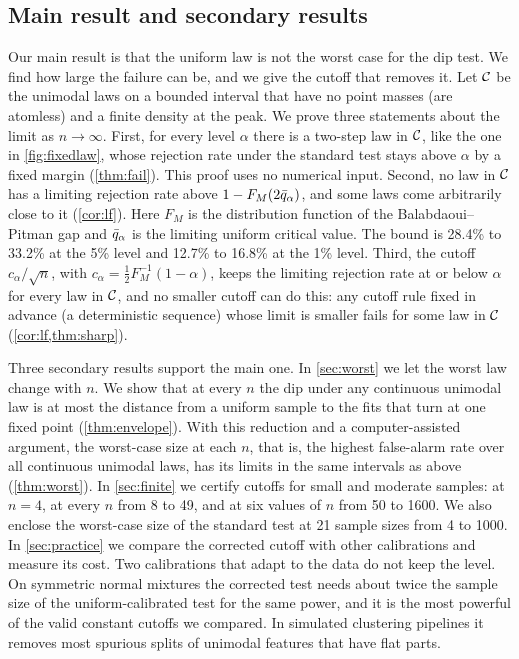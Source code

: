 \subsection{Main result and secondary results}\label{sec:contrib}
Our main result is that the uniform law is not the worst case for the dip test. We find how large the failure can be, and we give the cutoff that removes it. Let $\mathcal{C}$ be the unimodal laws on a bounded interval that have no point masses (are atomless) and a finite density at the peak. We prove three statements about the limit as $n\to\infty$. First, for every level $\alpha$ there is a two-step law in $\mathcal{C}$, like the one in \cref{fig:fixedlaw}, whose rejection rate under the standard test stays above $\alpha$ by a fixed margin (\cref{thm:fail}). This proof uses no numerical input. Second, no law in $\mathcal{C}$ has a limiting rejection rate above $1-F_M(2\bar q_\alpha)$, and some laws come arbitrarily close to it (\cref{cor:lf}). Here $F_M$ is the distribution function of the Balabdaoui--Pitman gap and $\bar q_\alpha$ is the limiting uniform critical value. The bound is 28.4\% to 33.2\% at the 5\% level and 12.7\% to 16.8\% at the 1\% level. Third, the cutoff $c_\alpha/\sqrt n$, with $c_\alpha=\tfrac12F_M^{-1}(1-\alpha)$, keeps the limiting rejection rate at or below $\alpha$ for every law in $\mathcal{C}$, and no smaller cutoff can do this: any cutoff rule fixed in advance (a deterministic sequence) whose limit is smaller fails for some law in $\mathcal{C}$ (\cref{cor:lf,thm:sharp}).

Three secondary results support the main one. In \cref{sec:worst} we let the worst law change with $n$. We show that at every $n$ the dip under any continuous unimodal law is at most the distance from a uniform sample to the fits that turn at one fixed point (\cref{thm:envelope}). With this reduction and a computer-assisted argument, the worst-case size at each $n$, that is, the highest false-alarm rate over all continuous unimodal laws, has its limits in the same intervals as above (\cref{thm:worst}). In \cref{sec:finite} we certify cutoffs for small and moderate samples: at $n=4$, at every $n$ from 8 to 49, and at six values of $n$ from 50 to 1600. We also enclose the worst-case size of the standard test at 21 sample sizes from 4 to 1000. In \cref{sec:practice} we compare the corrected cutoff with other calibrations and measure its cost. Two calibrations that adapt to the data do not keep the level. On symmetric normal mixtures the corrected test needs about twice the sample size of the uniform-calibrated test for the same power, and it is the most powerful of the valid constant cutoffs we compared. In simulated clustering pipelines it removes most spurious splits of unimodal features that have flat parts.

